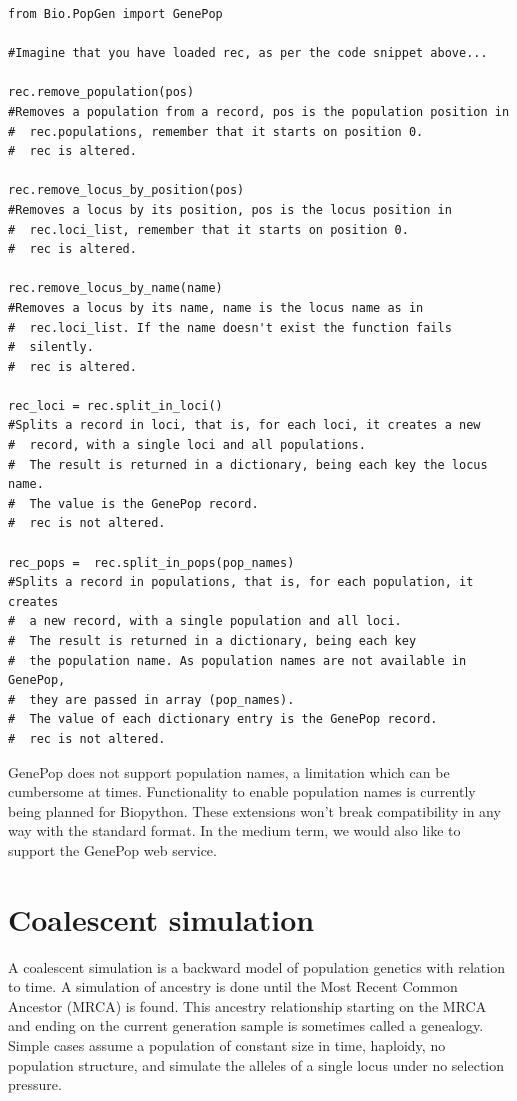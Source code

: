 \documentclass{report}
\begin{document}
\begin{verbatim}
from Bio.PopGen import GenePop

#Imagine that you have loaded rec, as per the code snippet above...

rec.remove_population(pos)
#Removes a population from a record, pos is the population position in
#  rec.populations, remember that it starts on position 0.
#  rec is altered.

rec.remove_locus_by_position(pos)
#Removes a locus by its position, pos is the locus position in
#  rec.loci_list, remember that it starts on position 0.
#  rec is altered.

rec.remove_locus_by_name(name)
#Removes a locus by its name, name is the locus name as in
#  rec.loci_list. If the name doesn't exist the function fails
#  silently.
#  rec is altered.

rec_loci = rec.split_in_loci()
#Splits a record in loci, that is, for each loci, it creates a new
#  record, with a single loci and all populations.
#  The result is returned in a dictionary, being each key the locus name.
#  The value is the GenePop record.
#  rec is not altered.

rec_pops =  rec.split_in_pops(pop_names)
#Splits a record in populations, that is, for each population, it creates
#  a new record, with a single population and all loci.
#  The result is returned in a dictionary, being each key
#  the population name. As population names are not available in GenePop,
#  they are passed in array (pop_names).
#  The value of each dictionary entry is the GenePop record.
#  rec is not altered.
\end{verbatim}

GenePop does not support population names, a limitation which can be
cumbersome at times. Functionality to enable population names is currently
being planned for Biopython. These extensions won't break compatibility in
any way with the standard format.  In the medium term, we would also like to
support the GenePop web service.

\section{Coalescent simulation}

A coalescent simulation is a backward model of population genetics with relation to
time. A simulation of ancestry is done until the Most Recent Common Ancestor (MRCA) is found.
This ancestry relationship starting on the MRCA and ending on the current generation
sample is sometimes called a genealogy. Simple cases assume a population of constant
size in time, haploidy, no population structure, and simulate the alleles of a single
locus under no selection pressure.
\end{document}
